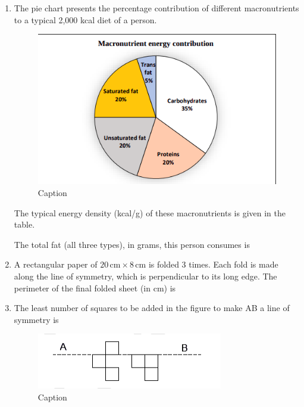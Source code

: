 \documentclass[journal,12pt,onecolumn]{IEEEtran}
\theoremstyle{remark}
\begin{document}
\begin{enumerate}
\item 
The pie chart presents the percentage contribution of different macronutrients to a
typical 2,000 kcal diet of a person. 
\begin{figure}[H]
    \centering
    \includegraphics[width=0.5\columnwidth]{figs/Screenshot from 2025-08-23 14-43-47.png}
    \caption{Caption}
    \label{fig:placeholder}
\end{figure}
The typical energy density (kcal/g) of these macronutrients is given in the table. 



The total fat (all three types), in grams, this person consumes is
\begin{enumerate}
\end{enumerate}

  \item 
A rectangular paper of $20 \,\text{cm} \times 8 \,\text{cm}$ is folded 3 times.  
Each fold is made along the line of symmetry, which is perpendicular to its long edge.  
The perimeter of the final folded sheet (in cm) is  
\begin{enumerate}
\end{enumerate}


\item 
The least number of squares to be added in the figure to make AB a line of symmetry is  

\begin{figure}[H]
    \centering
    \includegraphics[width=0.5\columnwidth]{figs/Screenshot from 2025-08-23 15-02-24.png}
    \caption{Caption}
    \label{fig:placeholder}
\end{figure}


\end{enumerate}
\end{document}
